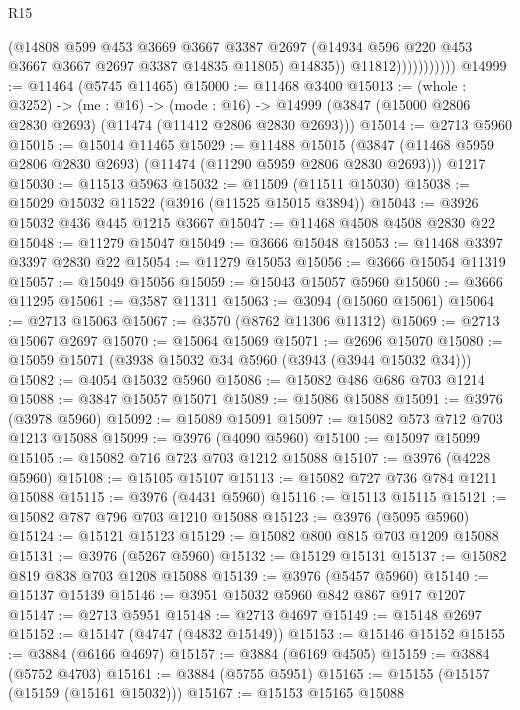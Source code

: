\begin{lexlean}{R15}
\begin{coremodule}
                            (@14808
                              @599
                              @453
                              @3669
                              @3667
                              @3387
                              @2697
                              (@14934 @596 @220 @453 @3667 @3667 @2697 @3387 @14835 @11805)
                              @14835))
                          @11812)))))))))))
@14999 := @11464 (@5745 @11465)
@15000 := @11468 @3400
@15013 := (whole : @3252) ->
  (me : @16) ->
  (mode : @16) -> @14999 (@3847 (@15000 @2806 @2830 @2693) (@11474 (@11412 @2806 @2830 @2693)))
@15014 := @2713 @5960
@15015 := @15014 @11465
@15029 := @11488
    @15015
    (@3847 (@11468 @5959 @2806 @2830 @2693) (@11474 (@11290 @5959 @2806 @2830 @2693)))
    @1217
@15030 := @11513 @5963
@15032 := @11509 (@11511 @15030)
@15038 := @15029 @15032 @11522 (@3916 (@11525 @15015 @3894))
@15043 := @3926 @15032 @436 @445 @1215 @3667
@15047 := @11468 @4508 @4508 @2830 @22
@15048 := @11279 @15047
@15049 := @3666 @15048
@15053 := @11468 @3397 @3397 @2830 @22
@15054 := @11279 @15053
@15056 := @3666 @15054 @11319
@15057 := @15049 @15056
@15059 := @15043 @15057 @5960
@15060 := @3666 @11295
@15061 := @3587 @11311
@15063 := @3094 (@15060 @15061)
@15064 := @2713 @15063
@15067 := @3570 (@8762 @11306 @11312)
@15069 := @2713 @15067 @2697
@15070 := @15064 @15069
@15071 := @2696 @15070
@15080 := @15059 @15071 (@3938 @15032 @34 @5960 (@3943 (@3944 @15032 @34)))
@15082 := @4054 @15032 @5960
@15086 := @15082 @486 @686 @703 @1214
@15088 := @3847 @15057 @15071
@15089 := @15086 @15088
@15091 := @3976 (@3978 @5960)
@15092 := @15089 @15091
@15097 := @15082 @573 @712 @703 @1213 @15088
@15099 := @3976 (@4090 @5960)
@15100 := @15097 @15099
@15105 := @15082 @716 @723 @703 @1212 @15088
@15107 := @3976 (@4228 @5960)
@15108 := @15105 @15107
@15113 := @15082 @727 @736 @784 @1211 @15088
@15115 := @3976 (@4431 @5960)
@15116 := @15113 @15115
@15121 := @15082 @787 @796 @703 @1210 @15088
@15123 := @3976 (@5095 @5960)
@15124 := @15121 @15123
@15129 := @15082 @800 @815 @703 @1209 @15088
@15131 := @3976 (@5267 @5960)
@15132 := @15129 @15131
@15137 := @15082 @819 @838 @703 @1208 @15088
@15139 := @3976 (@5457 @5960)
@15140 := @15137 @15139
@15146 := @3951 @15032 @5960 @842 @867 @917 @1207
@15147 := @2713 @5951
@15148 := @2713 @4697
@15149 := @15148 @2697
@15152 := @15147 (@4747 (@4832 @15149))
@15153 := @15146 @15152
@15155 := @3884 (@6166 @4697)
@15157 := @3884 (@6169 @4505)
@15159 := @3884 (@5752 @4703)
@15161 := @3884 (@5755 @5951)
@15165 := @15155 (@15157 (@15159 (@15161 @15032)))
@15167 := @15153 @15165 @15088

\end{coremodule}
\end{lexlean}
